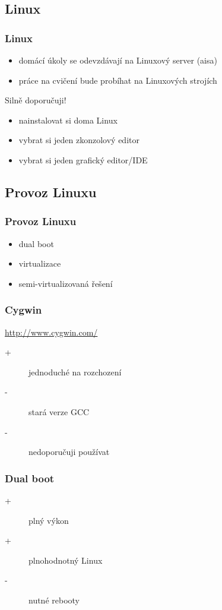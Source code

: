 \subsection{Linux}

\begin{frame}
	\frametitle{Linux}
	\begin{itemize}
		\item{domácí úkoly se odevzdávají na Linuxový server (aisa)}
		\item{práce na cvičení bude probíhat na Linuxových strojích}
	\end{itemize}
	\begin{block}{Silně doporučuji!}
		\begin{itemize}
		\item{nainstalovat si doma Linux}
		\item{vybrat si jeden zkonzolový editor}
		\item{vybrat si jeden grafický editor/IDE}
		\end{itemize}
	\end{block}
\end{frame}

\subsection{Provoz Linuxu}

\begin{frame}
	\frametitle{Provoz Linuxu}
	\begin{itemize}
		\item{dual boot}
		\item{virtualizace}
		\item{semi-virtualizovaná řešení}
	\end{itemize}
\end{frame}

\begin{frame}
	\frametitle{Cygwin}
	\href{http://www.cygwin.com/}{http://www.cygwin.com/}
	\begin{description}
		\item[+]{jednoduché na rozchození}
		\item[-]{\alert{stará verze GCC}}
		\item[-]{nedoporučuji používat}
	\end{description}
\end{frame}

\begin{frame}
	\frametitle{Dual boot}
	\begin{description}
		\item[+]{plný výkon}
		\item[+]{plnohodnotný Linux}
		\item[-]{nutné rebooty}
	\end{description}
\end{frame}

